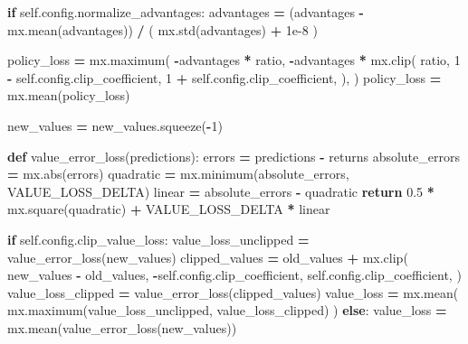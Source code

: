 \documentclass[
  american,
  11pt,
  letterpaper,
]{article}
\newenvironment{Shaded}{\begin{snugshade}}{\end{snugshade}}
\newcommand{\BuiltInTok}[1]{#1}
\newcommand{\ControlFlowTok}[1]{\textcolor[rgb]{0.13,0.29,0.53}{\textbf{#1}}}
\newcommand{\DecValTok}[1]{\textcolor[rgb]{0.00,0.00,0.81}{#1}}
\newcommand{\FloatTok}[1]{\textcolor[rgb]{0.00,0.00,0.81}{#1}}
\newcommand{\KeywordTok}[1]{\textcolor[rgb]{0.13,0.29,0.53}{\textbf{#1}}}
\newcommand{\NormalTok}[1]{#1}
\newcommand{\OperatorTok}[1]{\textcolor[rgb]{0.81,0.36,0.00}{\textbf{#1}}}
\newcommand{\VariableTok}[1]{\textcolor[rgb]{0.00,0.00,0.00}{#1}}
\renewenvironment{Shaded}{\par\smallskip}{\par\smallskip}
\begin{document}
\begin{Shaded}
\begin{Highlighting}[]
        \ControlFlowTok{if} \VariableTok{self}\NormalTok{.config.normalize\_advantages:}
\NormalTok{            advantages }\OperatorTok{=}\NormalTok{ (advantages }\OperatorTok{{-}}\NormalTok{ mx.mean(advantages)) }\OperatorTok{/}\NormalTok{ (}
\NormalTok{                mx.std(advantages) }\OperatorTok{+} \FloatTok{1e{-}8}
\NormalTok{            )}

\NormalTok{        policy\_loss }\OperatorTok{=}\NormalTok{ mx.maximum(}
            \OperatorTok{{-}}\NormalTok{advantages }\OperatorTok{*}\NormalTok{ ratio,}
            \OperatorTok{{-}}\NormalTok{advantages}
            \OperatorTok{*}\NormalTok{ mx.clip(}
\NormalTok{                ratio,}
                \DecValTok{1} \OperatorTok{{-}} \VariableTok{self}\NormalTok{.config.clip\_coefficient,}
                \DecValTok{1} \OperatorTok{+} \VariableTok{self}\NormalTok{.config.clip\_coefficient,}
\NormalTok{            ),}
\NormalTok{        )}
\NormalTok{        policy\_loss }\OperatorTok{=}\NormalTok{ mx.mean(policy\_loss)}

\NormalTok{        new\_values }\OperatorTok{=}\NormalTok{ new\_values.squeeze(}\OperatorTok{{-}}\DecValTok{1}\NormalTok{)}

        \KeywordTok{def}\NormalTok{ value\_error\_loss(predictions):}
\NormalTok{            errors }\OperatorTok{=}\NormalTok{ predictions }\OperatorTok{{-}}\NormalTok{ returns}
\NormalTok{            absolute\_errors }\OperatorTok{=}\NormalTok{ mx.}\BuiltInTok{abs}\NormalTok{(errors)}
\NormalTok{            quadratic }\OperatorTok{=}\NormalTok{ mx.minimum(absolute\_errors, VALUE\_LOSS\_DELTA)}
\NormalTok{            linear }\OperatorTok{=}\NormalTok{ absolute\_errors }\OperatorTok{{-}}\NormalTok{ quadratic}
            \ControlFlowTok{return} \FloatTok{0.5} \OperatorTok{*}\NormalTok{ mx.square(quadratic) }\OperatorTok{+}\NormalTok{ VALUE\_LOSS\_DELTA }\OperatorTok{*}\NormalTok{ linear}

        \ControlFlowTok{if} \VariableTok{self}\NormalTok{.config.clip\_value\_loss:}
\NormalTok{            value\_loss\_unclipped }\OperatorTok{=}\NormalTok{ value\_error\_loss(new\_values)}
\NormalTok{            clipped\_values }\OperatorTok{=}\NormalTok{ old\_values }\OperatorTok{+}\NormalTok{ mx.clip(}
\NormalTok{                new\_values }\OperatorTok{{-}}\NormalTok{ old\_values,}
                \OperatorTok{{-}}\VariableTok{self}\NormalTok{.config.clip\_coefficient,}
                \VariableTok{self}\NormalTok{.config.clip\_coefficient,}
\NormalTok{            )}
\NormalTok{            value\_loss\_clipped }\OperatorTok{=}\NormalTok{ value\_error\_loss(clipped\_values)}
\NormalTok{            value\_loss }\OperatorTok{=}\NormalTok{ mx.mean(}
\NormalTok{                mx.maximum(value\_loss\_unclipped, value\_loss\_clipped)}
\NormalTok{            )}
        \ControlFlowTok{else}\NormalTok{:}
\NormalTok{            value\_loss }\OperatorTok{=}\NormalTok{ mx.mean(value\_error\_loss(new\_values))}


\end{Highlighting}
\end{Shaded}
\end{document}
